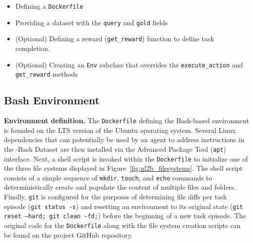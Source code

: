 \begin{itemize}[noitemsep,topsep=0pt]
    \item Defining a \texttt{Dockerfile}
    \item Providing a dataset with the \texttt{query} and \texttt{gold} fields
    \item (Optional) Defining a reward (\texttt{get\_reward}) function to define task completion.
    \item (Optional) Creating an \texttt{\benchmark{}Env} subclass that overrides the \texttt{execute\_action} and \texttt{get\_reward} methods
\end{itemize}

\subsection{Bash Environment}
\label{appx:env:bashenv}
\textbf{Environment definition.} The \texttt{Dockerfile} defining the Bash-based environment is founded on the LTS version of the Ubuntu operating system. Several Linux dependencies that can potentially be used by an agent to address instructions in the \benchmark{}-Bash Dataset are then installed via the Advanced Package Tool (\texttt{apt}) interface. Next, a shell script is invoked within the \texttt{Dockerfile} to initialize one of the three file systems displayed in Figure~\ref{fig:nl2b_filesystems}. The shell script consists of a simple sequence of \texttt{mkdir}, \texttt{touch}, and \texttt{echo} commands to deterministically create and populate the content of multiple files and folders. Finally, \texttt{git} is configured for the purposes of determining file diffs per task episode (\texttt{git status -s}) and resetting an environment to its original state (\texttt{git reset --hard; git clean -fd;}) before the beginning of a new task episode. The original code for the \texttt{Dockerfile} along with the file system creation scripts can be found on the project GitHub repository.



